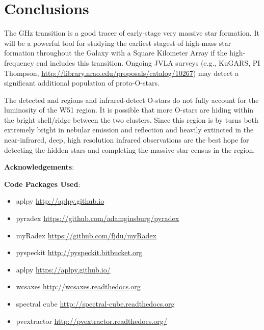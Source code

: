 \section{Conclusions}

The \formaldehyde {} GHz transition is a good tracer of early-stage
very massive star formation.  It will be a powerful tool for studying the earliest
stagest of high-mass star formation throughout the Galaxy with a Square
Kilometer Array if the high-frequency end includes this transition.  Ongoing
JVLA surveys (e.g., KuGARS, PI Thompson,
\url{http://library.nrao.edu/proposals/catalog/10267}) may detect a significant
additional population of proto-O-stars.

The detected \uchii and \hchii regions and infrared-detect O-stars do not fully
account for the luminosity of the W51 region.  It is possible that more O-stars
are hiding within the bright shell/ridge between the two clusters.  Since this
region is by turns both extremely bright in nebular emission and reflection and
heavily extincted in the near-infrared, deep, high resolution infrared
observations are the best hope for detecting the hidden stars and completing
the massive star census in the region.


\textbf{Acknowledgements}:

\textbf{Code Packages Used}:

\begin{itemize}
    \item aplpy \url{http://aplpy.github.io}
    \item pyradex \url{https://github.com/adamginsburg/pyradex}
    \item myRadex \url{https://github.com/fjdu/myRadex}
    \item pyspeckit \url{http://pyspeckit.bitbucket.org}
    \item aplpy \url{https://aplpy.github.io/}
    \item wcsaxes \url{http://wcsaxes.readthedocs.org}
    \item spectral cube \url{http://spectral-cube.readthedocs.org}
    \item pvextractor \url{http://pvextractor.readthedocs.org/}
\end{itemize}




%


